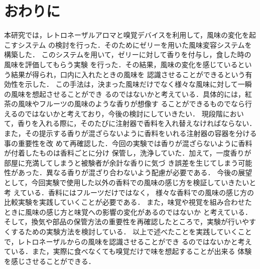 \section{おわりに}

本研究では，レトロネーザルアロマと嗅覚デバイスを利用して，風味の変化を起こすシステム
の検討を行った．そのためにゼリーを用いた風味変容システムを構築した．
このシステムを用いて，ゼリーに対して香りを付与し，食した時の風味を評価してもらう実験
を行った．その結果，風味の変化を感じているという結果が得られ，口内に入れたときの風味を
認識させることができるという有効性を示した．
この手法は，決まった風味だけでなく様々な風味に対して一瞬の風味を想起させることができ
るのではないかと考えている．具体的には，紅茶の風味やフルーツの風味のような香りが想像す
ることができるものでなら行えるのではないかと考えており，今後の検討にしていきたい．
現段階において，香りを入れる際に，そのたびに注射器で香料を入れ替えなければならない．
また，その提示する香りが混ざらないように香料をいれる注射器の容器を分ける事の重要性を改
めて再確認した．今回の実験では香りが混ざらないように香料が付着したものは香料ごとに分け
保管し，洗浄していた．加えて，一度香りが部屋に充満してしまうと被験者が余計な香りに気づ
き誤差を生じてしまう可能性があった．異なる香りが混ざり合わないよう配慮が必要である．
今後の展望として，今回実験で使用した以外の香料での風味の感じ方を検証していきたいと考
えている．香料にはフルーツだけではなく，
様々な香料での風味の感じ方の比較実験を実践していくことが必要である．
また，味覚や視覚を組み合わせたときに風味の感じ方と味覚への影響の変化があるのではないか
と考えている．そして，換気や部品の保管方法の重要性を再確認したところで，実験が行いやす
くするための実験方法を検討している．
以上で述べたことを実践していくことで，レトロネーザルからの風味を認識させることができ
るのではないかと考えている．また，実際に食べなくても嗅覚だけで味を想起することが出来る
体験を感じさせることができる．
